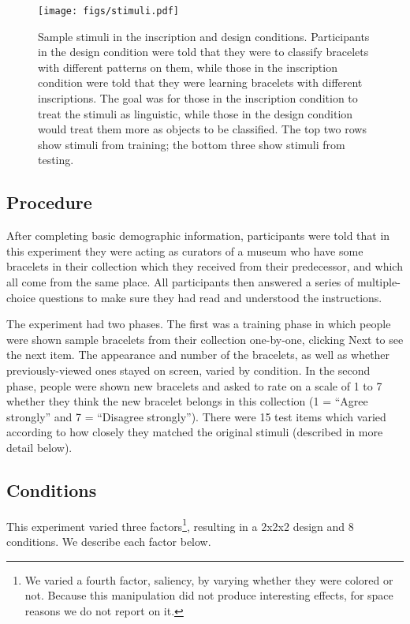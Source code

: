 \documentclass[10pt,letterpaper]{article}
\begin{document}
\begin{figure}[t]
\begin{center}
\texttt{[image: figs/stimuli.pdf]}
\end{center}
\caption{Sample stimuli in the {\sc inscription} and {\sc design} conditions. Participants in the {\sc design} condition were told that they were to classify bracelets with different patterns on them, while those in the {\sc inscription} condition were told that they were learning bracelets with different inscriptions. The goal was for those in the {\sc inscription} condition to treat the stimuli as linguistic, while those in the {\sc design} condition would treat them more as objects to be classified. The top two rows show stimuli from training; the bottom three show stimuli from testing.}
\label{stimuli}
\end{figure}

\subsection{Procedure}

After completing basic demographic information, participants were told that in this experiment they were acting as curators of a museum who have some bracelets in their collection which they received from their predecessor, and which all come from the same place. All participants then answered a series of multiple-choice questions to make sure they had read and understood the instructions.  

The experiment had two phases. The first was a training phase in which people were shown sample bracelets from their collection one-by-one, clicking \textsf{Next} to see the next item. The appearance and number of the bracelets, as well as whether previously-viewed ones stayed on screen, varied by condition. In the second phase, people were shown new bracelets and asked to rate on a scale of 1 to 7 whether they think the new bracelet belongs in this collection (1 = ``Agree strongly'' and 7 = ``Disagree strongly''). There were 15 test items which varied according to how closely they matched the original stimuli (described in more detail below).

\subsection{Conditions}

This experiment varied three factors\footnote{We varied a fourth factor, saliency, by varying whether they were colored or not. Because this manipulation did not produce interesting effects, for space reasons we do not report on it.}, resulting in a 2x2x2 design and 8 conditions. We describe each factor below.
\end{document}
